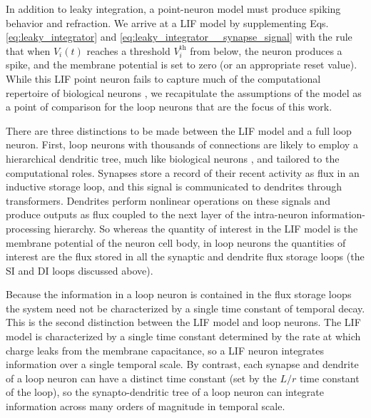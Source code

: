\documentclass[twocolumn]{article}
\begin{document}
In addition to leaky integration, a point-neuron model must produce spiking behavior and refraction. We arrive at a LIF model by supplementing Eqs.\,\ref{eq:leaky_integrator} and \ref{eq:leaky_integrator__synapse_signal} with the rule that when $V_i(t)$ reaches a threshold $V_i^{\mathrm{th}}$ from below, the neuron produces a spike, and the membrane potential is set to zero (or an appropriate reset value). While this LIF point neuron fails to capture much of the computational repertoire of biological neurons \cite{kose2000}, we recapitulate the assumptions of the model as a point of comparison for the loop neurons that are the focus of this work.

There are three distinctions to be made between the LIF model and a full loop neuron. First, loop neurons with thousands of connections are likely to employ a hierarchical dendritic tree, much like biological neurons \cite{me1994,loha2005,haah2016}, and tailored to the computational roles. Synapses store a record of their recent activity as flux in an inductive storage loop, and this signal is communicated to dendrites through transformers. Dendrites perform nonlinear operations on these signals and produce outputs as flux coupled to the next layer of the intra-neuron information-processing hierarchy. So whereas the quantity of interest in the LIF model is the membrane potential of the neuron cell body, in loop neurons the quantities of interest are the flux stored in all the synaptic and dendrite flux storage loops (the SI and DI loops discussed above).

Because the information in a loop neuron is contained in the flux storage loops the system need not be characterized by a single time constant of temporal decay. This is the second distinction between the LIF model and loop neurons. The LIF model is characterized by a single time constant determined by the rate at which charge leaks from the membrane capacitance, so a LIF neuron integrates information over a single temporal scale. By contrast, each synapse and dendrite of a loop neuron can have a distinct time constant (set by the $L/r$ time constant of the loop), so the synapto-dendritic tree of a loop neuron can integrate information across many orders of magnitude in temporal scale.
\end{document}
